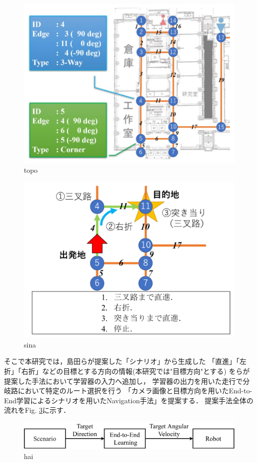 \begin{figure}[H]
    \centering
    \includegraphics[width = 13cm]{./figs/topo.png}
    \caption{topo\cite{razikon}}
    \label{fig::topo}
\end{figure}
\begin{figure}[H]
    \centering
    \includegraphics[width = 13cm]{./figs/sina.png}
    \caption{sina\cite{razikon}}
    \label{fig::sina}
\end{figure}

そこで本研究では，島田らが提案した「シナリオ」から生成した
「直進」「左折」「右折」などの目標とする方向の情報(本研究では"目標方向"とする)
を\cite{okada}らが提案した手法において学習器の入力へ追加し，
学習器の出力を用いた走行で分岐路において特定のルート選択を行う
「カメラ画像と目標方向を用いたEnd-to-End学習によるシナリオを用いたNavigation手法」を提案する．
提案手法全体の流れをFig. \ref{fig::haikei_zentai}に示す．
\begin{figure}[H]
    \centering
    \includegraphics[width = 13cm]{./figs/haikei_zentai.pdf}
    \caption{hai}
    \label{fig::haikei_zentai}
\end{figure}

